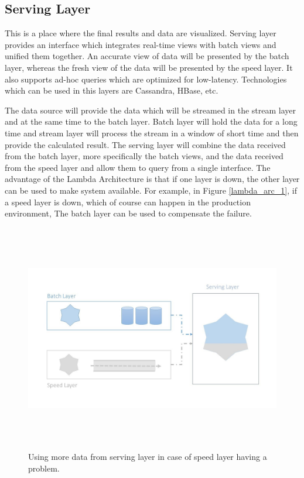 \subsection{Serving Layer}
This is a place where the final results and data are visualized. Serving layer provides an interface which integrates real-time views with batch views and unified them together. An accurate view of data will be presented by the batch layer, whereas the fresh view of the data will be presented by the speed layer. It also supports ad-hoc queries which are optimized for low-latency. Technologies which can be used in this layers are Cassandra, HBase, etc.

The data source will provide the data which will be streamed in the stream layer and at the same time to the batch layer. Batch layer will hold the data for a long time and stream layer will process the stream in a window of short time and then provide the calculated result. The serving layer will combine the data received from the batch layer, more specifically the batch views, and the data received from the speed layer and allow them to query from a single interface. The advantage of the Lambda Architecture is that if one layer is down, the other layer can be used to make system available. For example, in Figure \ref{lambda_arc_1}, if a speed layer is down, which of course can happen in the production environment, The batch layer can be used to compensate the failure.


\begin{figure}[htpb]
	\centering
	\includegraphics[width=12cm,height=10cm,keepaspectratio=true]{images/lambda_arc_1}
	\caption{
		Using more data from serving layer in case of speed layer having a problem.
	}
	\label{fig:lambda_arc_1}
\end{figure}

